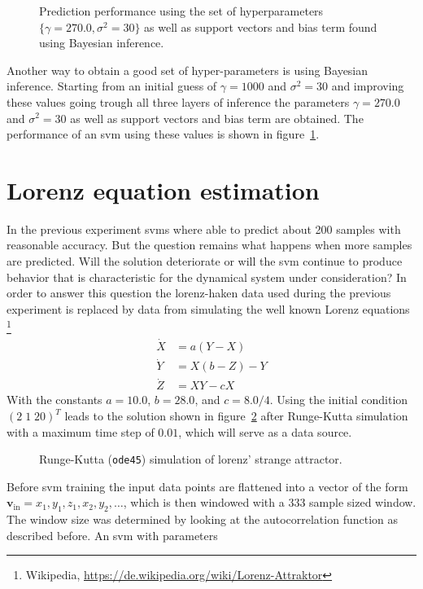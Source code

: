 \begin{figure}
\centering
\tikzset{mark size=1}

\caption{Prediction performance using the set of hyperparameters $\{\gamma =  270.0, \sigma^2 = 30\}$ as well as support vectors and bias term found using Bayesian inference.}
\label{fig:SantaFeBayes}
\end{figure}
Another way to obtain a good set of hyper-parameters is using Bayesian inference. Starting from an initial guess of $\gamma = 1000$ and $\sigma^2 = 30$ and improving these values going trough all three layers of inference the parameters $\gamma =  270.0$ and $\sigma^2 = 30$ as well as support vectors and bias term are obtained. The performance of an svm using these values is shown in figure~\ref{fig:SantaFeBayes}.

\section{Lorenz equation estimation}
In the previous experiment svms where able to predict about 200 samples with reasonable accuracy. But the question remains what happens when more samples are predicted. Will the solution deteriorate or will the svm continue to produce behavior that is characteristic for the dynamical system under consideration?
In order to answer this question the lorenz-haken data used during the previous experiment is replaced by data from simulating the well known Lorenz equations \footnote{Wikipedia, \url{https://de.wikipedia.org/wiki/Lorenz-Attraktor}} 
\begin{align}
\dot{X} &= a(Y - X) \\
\dot{Y} &= X(b - Z) - Y \\
\dot{Z} &= XY - cX
\end{align}
With the constants $a = 10.0$, $b = 28.0$, and  $c = 8.0/4$. Using the initial condition $(2 \; 1 \; 20)^T$ leads to the solution shown in figure~\ref{fig:lorenz} after Runge-Kutta simulation with a maximum time step of $0.01$, which will serve as a data source.
\begin{figure}
\centering

\caption{Runge-Kutta (\texttt{ode45}) simulation of lorenz' strange attractor.}
\label{fig:lorenz}
\end{figure}
Before svm training the input data points are flattened into a vector of the form $\mathbf{v}_{\text{in}} = x_1 , y_1, z_1, x_2 , y_2 , \dots$, which is then windowed with a 333 sample sized window. The window size was determined by looking at the autocorrelation function as described before. An svm with parameters
